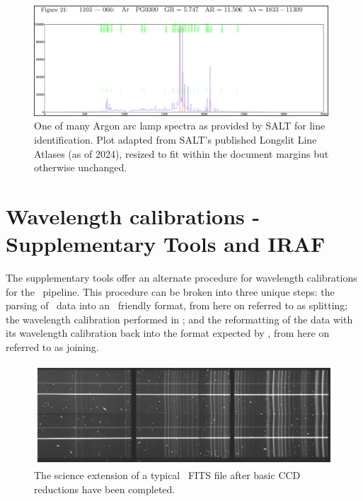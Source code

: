 \begin{figure}[t]
    \centering
    \includegraphics[width = 0.98\textwidth]{figures/3_arc_spectrum.png}
    \caption{One of many Argon arc lamp spectra as provided by \gls{SALT} for line identification. Plot adapted from \gls{SALT}'s published Longslit Line Atlases (as of 2024)\protect\footnotemark, resized to fit within the document margins but otherwise unchanged.}
    \label{fig:ar_arc_salt}
\end{figure}


\section{Wavelength calibrations - Supplementary Tools and IRAF} \label{sec:mod_tools}

The supplementary tools offer an alternate procedure for wavelength calibrations for the \polsalt\ pipeline. This procedure can be broken into three unique steps: the parsing of \polsalt\ data into an \iraf\ friendly format, from here on referred to as splitting; the wavelength calibration performed in \iraf; and the reformatting of the data with its wavelength calibration back into the format expected by \polsalt, from here on referred to as joining.

\begin{figure}[t]
    \centering
    \includegraphics[width = 1.0\textwidth]{figures/3_pre_wav_cal.pdf}
    \caption{The science extension of a typical \polsalt\ \acs{FITS} file after basic \gls{CCD} reductions have been completed.}
    \label{fig:polsalt_pre_wav_cal}
\end{figure}


